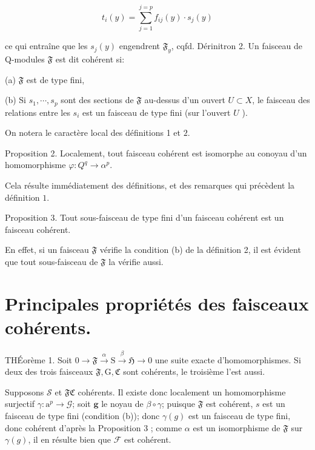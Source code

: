 $$
t_{i}(y)=\sum_{j=1}^{j=p} f_{i j}(y) \cdot s_{j}(y)
$$

ce qui entraîne que les $s_{j}(y)$ engendrent $\mathfrak{F}_{y}$, cqfd. Dérinitron 2. Un faisceau de Q-modules $\mathfrak{F}$ est dit cohérent si:

(a) $\mathfrak{F}$ est de type fini,

(b) Si $s_{1}, \cdots, s_{p}$ sont des sections de $\mathfrak{F}$ au-dessus d'un ouvert $U \subset X$, le faisceau des relations entre les $s_{i}$ est un faisceau de type fini (sur l'ouvert $U$ ).

On notera le caractère local des définitions 1 et $2 .$

Proposition 2. Localement, tout faisceau cohérent est isomorphe au conoyau d'un homomorphisme $\varphi: Q^{q} \rightarrow \alpha^{p}$.

Cela résulte immédiatement des définitions, et des remarques qui précèdent la définition $1 .$

Proposition 3. Tout sous-faisceau de type fini d'un faisceau cohérent est un faisceau cohérent.

En effet, si un faisceau $\mathfrak{F}$ vérifie la condition (b) de la définition 2, il est évident que tout sous-faisceau de $\mathfrak{F}$ la vérifie aussi.

\section{Principales propriétés des faisceaux cohérents.}

THÉorème 1. Soit $0 \rightarrow \mathfrak{F} \stackrel{\alpha}{\rightarrow} \mathrm{S} \stackrel{\beta}{\rightarrow} \mathfrak{H} \rightarrow 0$ une suite exacte d'homomorphismes. Si deux des trois faisceaux $\mathfrak{F}, \mathrm{G}, \mathfrak{C}$ sont cohérents, le troisième l'est aussi.

Supposons $\mathcal{S}$ et $\mathfrak{F C}$ cohérents. Il existe donc localement un homomorphisme surjectif $\gamma: \mathrm{a}^{p} \rightarrow \mathcal{G}$; soit $\boldsymbol{g}$ le noyau de $\beta \circ \gamma$; puisque $\mathfrak{F}$ est cohérent, $s$ est un faisceau de type fini (condition (b)); donc $\gamma(g)$ est un faisceau de type fini, donc cohérent d'après la Proposition 3 ; comme $\alpha$ est un isomorphisme de $\mathfrak{F}$ sur $\gamma(g)$, il en résulte bien que $\mathcal{F}$ est cohérent.

